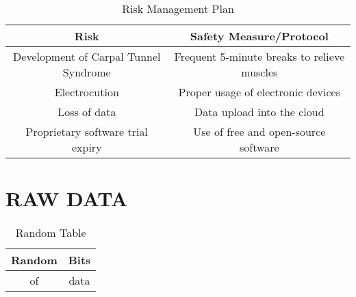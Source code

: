 \documentclass{strrespaper-trad}
\begin{document}
\begin{landscape}
        \begin{table}[htbp]
            \centering
            \caption{Risk Management Plan}
            \label{tab:risk_management}
            \begin{tabularx}{\textwidth}{cc}
                \toprule
                Risk                                  & Safety Measure/Protocol                     \\
                \midrule
                Development of Carpal Tunnel Syndrome & Frequent 5-minute breaks to relieve muscles \\
                Electrocution                         & Proper usage of electronic devices          \\
                Loss of data                          & Data upload into the cloud                  \\
                Proprietary software trial expiry     & Use of free and open-source software        \\
                \bottomrule
            \end{tabularx}
        \end{table}
    \end{landscape}

    \section{RAW DATA}
    \begin{table}[htbp]
        \centering
        \begin{tabular}{cc}
            \toprule
            Random & Bits \\
            \midrule
            of & data \\
            \bottomrule
        \end{tabular}
        \caption{Random Table}
        \label{tab:random}
    \end{table}
    \lstset{language=Python, breaklines=true, numbers=left, stringstyle=\ttfamily\small, basicstyle=\singlespacing}
    
    
\end{document}

